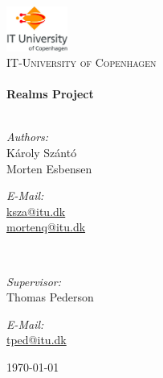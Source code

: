 \begin{titlepage}

\begin{center}


\includegraphics[width=0.15\textwidth]{./fig/itu_logo}\\[1cm]    

\textsc{\LARGE IT-University of Copenhagen}\\[2.0cm]

\HRule \\[0.4cm]
{ \huge \bfseries Realms Project}\\[0.4cm]

\HRule \\[1.5cm]

\begin{minipage}{0.4\textwidth}
\begin{flushleft} \large
\emph{Authors:}\\
K\'aroly Sz\'ant\'o\\
Morten Esbensen\\
\end{flushleft}
\end{minipage}
\begin{minipage}{0.4\textwidth}
\begin{flushright} \large
\emph{E-Mail:} \\
\href{mailto:ksza@itu.dk}{ksza@itu.dk}\\
\href{mailto:mortenq@itu.dk}{mortenq@itu.dk}\\
\end{flushright}
\end{minipage}\\[0.8cm]

\begin{minipage}{0.4\textwidth}
\begin{flushleft} \large
\emph{Supervisor:}\\
Thomas Pederson\\
\end{flushleft}
\end{minipage}
\begin{minipage}{0.4\textwidth}
\begin{flushright} \large
\emph{E-Mail:} \\
\href{mailto:tped@itu.dk}{tped@itu.dk}\\
\end{flushright}
\end{minipage}

\vfill

{\large \today}

\end{center}

\end{titlepage}